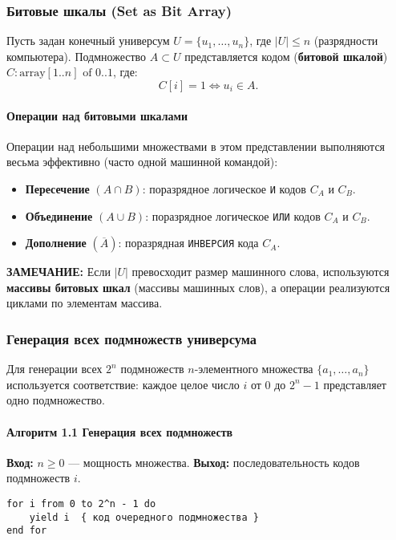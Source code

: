 \subsubsection*{Битовые шкалы (Set as Bit Array)}
Пусть задан конечный универсум $U = \{u_1, \ldots, u_n\}$, где $|U| \le n$ (разрядности компьютера).
Подмножество $A \subset U$ представляется кодом (\textbf{битовой шкалой}) $C: \text{array} [1..n] \text{ of } 0..1$, где:
$$C[i] = 1 \iff u_i \in A.$$

\paragraph{Операции над битовыми шкалами}
Операции над небольшими множествами в этом представлении выполняются весьма эффективно (часто одной машинной командой):
\begin{itemize}
    \item \textbf{Пересечение} $(A \cap B)$: поразрядное логическое \texttt{И} кодов $C_A$ и $C_B$.
    \item \textbf{Объединение} $(A \cup B)$: поразрядное логическое \texttt{ИЛИ} кодов $C_A$ и $C_B$.
    \item \textbf{Дополнение} $(\overline{A})$: поразрядная \texttt{ИНВЕРСИЯ} кода $C_A$.
\end{itemize}

\textbf{ЗАМЕЧАНИЕ:} Если $|U|$ превосходит размер машинного слова, используются \textbf{массивы битовых шкал} (массивы машинных слов), а операции реализуются циклами по элементам массива.

\subsubsection*{Генерация всех подмножеств универсума}

Для генерации всех $2^n$ подмножеств $n$-элементного множества $\{a_1, \ldots, a_n\}$ используется соответствие: каждое целое число $i$ от $0$ до $2^n-1$ представляет одно подмножество.

\paragraph{Алгоритм 1.1 Генерация всех подмножеств}
\textbf{Вход:} $n \ge 0$ --- мощность множества.
\textbf{Выход:} последовательность кодов подмножеств $i$.
\begin{verbatim}
for i from 0 to 2^n - 1 do
    yield i  { код очередного подмножества }
end for
\end{verbatim}

